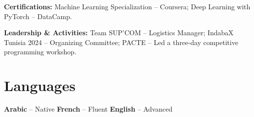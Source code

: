 \documentclass[10pt,letterpaper]{article}
\begin{document}
\textbf{Certifications:}
Machine Learning Specialization -- Coursera;
Deep Learning with PyTorch -- DataCamp.



\textbf{Leadership \& Activities:}
Team SUP'COM -- Logistics Manager;
IndabaX Tunisia 2024 -- Organizing Committee;
PACTE -- Led a three-day competitive programming workshop.


\section{Languages}

\textbf{Arabic} -- Native
\hfill
\textbf{French} -- Fluent
\hfill
\textbf{English} -- Advanced
\end{document}
